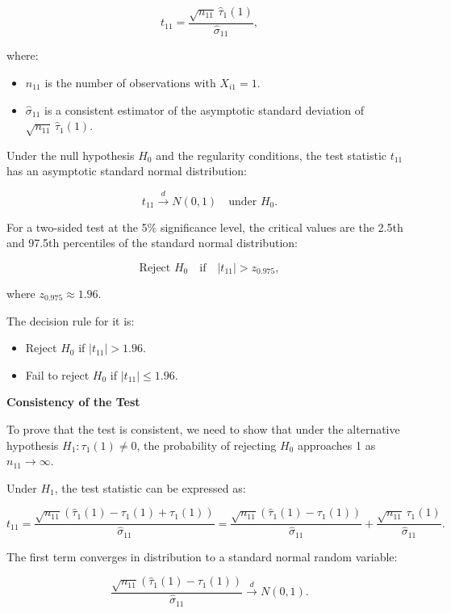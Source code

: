 \documentclass{article}
\begin{document}
\[
t_{11} = \frac{\sqrt{n_{11}} \, \hat{\tau}_1(1)}{\hat{\sigma}_{11}},
\]

where:
\begin{itemize}
    \item \( n_{11} \) is the number of observations with \( X_{i1} = 1 \).
    \item \( \hat{\sigma}_{11} \) is a consistent estimator of the asymptotic standard deviation of \( \sqrt{n_{11}} \, \hat{\tau}_1(1) \).
\end{itemize}

Under the null hypothesis \( H_0 \) and the regularity conditions, the test statistic \( t_{11} \) has an asymptotic standard normal distribution:

\[
t_{11} \xrightarrow{d} N(0,1) \quad \text{under } H_0.
\]

For a two-sided test at the 5\% significance level, the critical values are the 2.5th and 97.5th percentiles of the standard normal distribution:

\[
\text{Reject } H_0 \quad \text{if} \quad |t_{11}| > z_{0.975},
\]

where \( z_{0.975} \approx 1.96 \).

The decision rule for it is:

\begin{itemize}
    \item Reject \( H_0 \) if \( |t_{11}| > 1.96 \).
    \item Fail to reject \( H_0 \) if \( |t_{11}| \leq 1.96 \).
\end{itemize}

\textbf{Consistency of the Test}

To prove that the test is consistent, we need to show that under the alternative hypothesis \( H_1: \tau_1(1) \neq 0 \), the probability of rejecting \( H_0 \) approaches 1 as \( n_{11} \to \infty \).

Under \( H_1 \), the test statistic can be expressed as:

\[
t_{11} = \frac{\sqrt{n_{11}} \left( \hat{\tau}_1(1) - \tau_1(1) + \tau_1(1) \right)}{\hat{\sigma}_{11}} = \frac{\sqrt{n_{11}} \left( \hat{\tau}_1(1) - \tau_1(1) \right)}{\hat{\sigma}_{11}} + \frac{\sqrt{n_{11}} \, \tau_1(1)}{\hat{\sigma}_{11}}.
\]

The first term converges in distribution to a standard normal random variable:

\[
\frac{\sqrt{n_{11}} \left( \hat{\tau}_1(1) - \tau_1(1) \right)}{\hat{\sigma}_{11}} \xrightarrow{d} N(0,1).
\]
\end{document}
